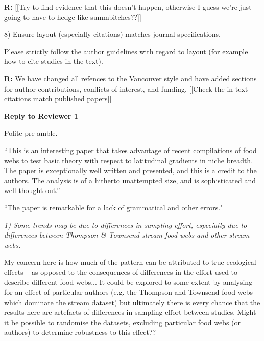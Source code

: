 \documentclass[12pt]{letter}
\newenvironment{refquote}{\bigskip \begin{it}}{\end{it}\smallskip}
\begin{document}
  \textbf{R:} [[Try to find evidence that this doesn't happen, otherwise I guess we're just going to have to hedge like summbitches??]]


  8) Ensure layout (especially citations) matches journal specifications.

  \begin{refquote}

    Please strictly follow the author guidelines with regard to layout (for
    example how to cite studies in the text).

  \end{refquote}

  \textbf{R:} We have changed all refences to the Vancouver style and have added sections for author contributions, conflicts of interest, and funding.
  [[Check the in-text citations match published papers]]

  \newpage

{\Large \bf Reply to Reviewer 1}

  Polite pre-amble.

  ``This is an interesting paper that takes advantage of recent compilations
  of food webs to test basic theory with respect to latitudinal gradients in
  niche breadth. The paper is exceptionally well written and presented, and this
  is a credit to the    authors. The analysis is of a hitherto unattempted size,
  and is sophisticated and well thought out.''

  ``The paper is remarkable for a lack of grammatical and other errors."

  \emph{
  1) Some trends may be due to differences in sampling effort, especially
  due to differences between Thompson \& Townsend stream food webs and other
  stream webs.}


  \begin{refquote}

    My concern here is how much of the pattern can be attributed to true
    ecological effects – as opposed to the consequences of differences in the
    effort used to describe different food webs... It could be explored to some extent by
    analysing for an effect of particular authors (e.g. the Thompson and
    Townsend food webs which dominate the stream dataset) but ultimately there
    is every chance that the results here are artefacts of differences in
    sampling effort between studies. Might it be possible to randomise the
    datasets, excluding particular food webs (or authors) to determine
    robustness to this effect?? 

  \end{refquote}
\end{document}
